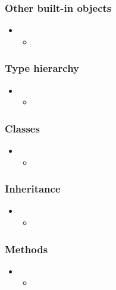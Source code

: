 \begin{frame}[fragile]
%
  \frametitle{Other built-in objects}
%
  \begin{itemize}
%
  \item 
    \begin{itemize}
    \item
    \end{itemize}
%
  \end{itemize}
%
\end{frame}

\begin{frame}[fragile]
%
  \frametitle{Type hierarchy}
%
  \begin{itemize}
%
  \item 
    \begin{itemize}
    \item
    \end{itemize}
%
  \end{itemize}
%
\end{frame}

\begin{frame}[fragile]
%
  \frametitle{Classes}
%
  \begin{itemize}
%
  \item 
    \begin{itemize}
    \item
    \end{itemize}
%
  \end{itemize}
%
\end{frame}

\begin{frame}[fragile]
%
  \frametitle{Inheritance}
%
  \begin{itemize}
%
  \item 
    \begin{itemize}
    \item
    \end{itemize}
%
  \end{itemize}
%
\end{frame}

\begin{frame}[fragile]
%
  \frametitle{Methods}
%
  \begin{itemize}
%
  \item 
    \begin{itemize}
    \item
    \end{itemize}
%
  \end{itemize}
%
\end{frame}

